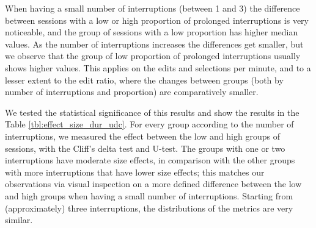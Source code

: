 When having a small number of interruptions (between 1 and 3) the difference between sessions with a low or high proportion of prolonged interruptions is very noticeable, and the group of sessions with a low proportion has higher median values. As the number of interruptions increases the differences get smaller, but we observe that the group of low proportion of prolonged interruptions usually shows higher values. This applies on the edits and selections per minute, and to a lesser extent to the edit ratio, where the changes between groups (both by number of interruptions and proportion) are comparatively smaller.

We tested the statistical significance of this results and show the results in the Table \ref{tbl:effect_size_dur_udc}. For every group according to the number of interruptions, we measured the effect between the low and high groups of sessions, with the Cliff's delta test and U-test. The groups with one or two interruptions have moderate size effects, in comparison with the other groups with more interruptions that have lower size effects; this matches our observations via visual inspection on a more defined difference between the low and high groups when having a small number of interruptions. Starting from (approximately) three interruptions, the distributions of the metrics are very similar.

